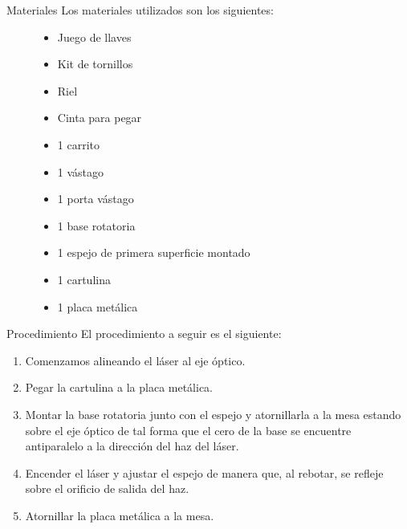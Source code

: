 \documentclass{beamer}
\begin{document}
\begin{frame}{Materiales}
Los materiales utilizados son los siguientes: \\

\begin{figure}[!htb]
    \begin{minipage}{0.45\linewidth}
        \centering
        \begin{itemize}
        \item Juego de llaves
        \item Kit de tornillos
        \item Riel 
        \item Cinta para pegar 
        \item 1 carrito
        \item 1 vástago
    \end{itemize}
    \end{minipage}
    \hfill
    \begin{minipage}{0.45\linewidth}
        \begin{itemize}
            \item 1 porta vástago
            \item 1 base rotatoria
            \item 1 espejo de primera superficie montado
            \item 1 cartulina
            \item 1 placa metálica
        \end{itemize}
    \end{minipage}
\end{figure}
\end{frame}


\begin{frame}{Procedimiento}
El procedimiento a seguir es el siguiente:\\
    \vspace{0.5cm}
    \begin{enumerate} 
    \item Comenzamos alineando el láser al eje óptico.
    \item Pegar la cartulina a la placa metálica.
    \item Montar la base rotatoria junto con el espejo y atornillarla a la mesa estando sobre el eje óptico de tal forma que el cero de la base se encuentre antiparalelo a la dirección del haz del láser.
    \item Encender el láser y ajustar el espejo de manera que, al rebotar, se refleje sobre el orificio de salida del haz.
    \item Atornillar la placa metálica a la mesa.

\end{enumerate}
\end{frame}
\end{document}
